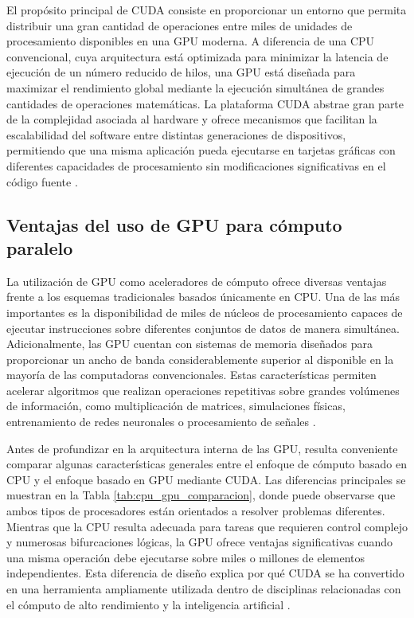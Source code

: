 El propósito principal de CUDA consiste en proporcionar un entorno que permita distribuir una gran cantidad de operaciones entre miles de unidades de procesamiento disponibles en una GPU moderna. A diferencia de una CPU convencional, cuya arquitectura está optimizada para minimizar la latencia de ejecución de un número reducido de hilos, una GPU está diseñada para maximizar el rendimiento global mediante la ejecución simultánea de grandes cantidades de operaciones matemáticas. La plataforma CUDA abstrae gran parte de la complejidad asociada al hardware y ofrece mecanismos que facilitan la escalabilidad del software entre distintas generaciones de dispositivos, permitiendo que una misma aplicación pueda ejecutarse en tarjetas gráficas con diferentes capacidades de procesamiento sin modificaciones significativas en el código fuente \cite{nvidiaProgrammingGuide,investigacionCUDA}.

\subsection{Ventajas del uso de GPU para cómputo paralelo}

La utilización de GPU como aceleradores de cómputo ofrece diversas ventajas frente a los esquemas tradicionales basados únicamente en CPU. Una de las más importantes es la disponibilidad de miles de núcleos de procesamiento capaces de ejecutar instrucciones sobre diferentes conjuntos de datos de manera simultánea. Adicionalmente, las GPU cuentan con sistemas de memoria diseñados para proporcionar un ancho de banda considerablemente superior al disponible en la mayoría de las computadoras convencionales. Estas características permiten acelerar algoritmos que realizan operaciones repetitivas sobre grandes volúmenes de información, como multiplicación de matrices, simulaciones físicas, entrenamiento de redes neuronales o procesamiento de señales \cite{nvidiaCUDA,awsGPUCPU}.

Antes de profundizar en la arquitectura interna de las GPU, resulta conveniente comparar algunas características generales entre el enfoque de cómputo basado en CPU y el enfoque basado en GPU mediante CUDA. Las diferencias principales se muestran en la Tabla \ref{tab:cpu_gpu_comparacion}, donde puede observarse que ambos tipos de procesadores están orientados a resolver problemas diferentes. Mientras que la CPU resulta adecuada para tareas que requieren control complejo y numerosas bifurcaciones lógicas, la GPU ofrece ventajas significativas cuando una misma operación debe ejecutarse sobre miles o millones de elementos independientes. Esta diferencia de diseño explica por qué CUDA se ha convertido en una herramienta ampliamente utilizada dentro de disciplinas relacionadas con el cómputo de alto rendimiento y la inteligencia artificial \cite{awsGPUCPU,nvidiaProgrammingGuide}.

